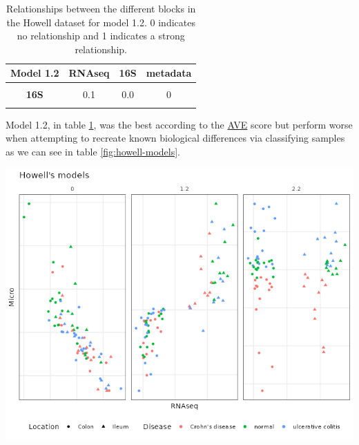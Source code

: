 \documentclass[
  12pt,
  a4paper,
  twoside,
  openright]{book}
\let\origfigure\figure
\let\endorigfigure\endfigure
\renewenvironment{figure}[1][2] {
    \expandafter\origfigure\expandafter[!htbp]
} {
    \endorigfigure
}
\begin{document}
\begin{table}[H]

\caption[Model 1.2 of the Howell dataset.]{\label{tab:howell-model1-2}Relationships between the different blocks in the Howell dataset for model 1.2. 0 indicates no relationship and 1 indicates a strong relationship.}
\centering
\begin{tabular}[t]{>{}c|c|c|c}
\hline
\textbf{Model 1.2} & \textbf{RNAseq} & \textbf{16S} & \textbf{metadata}\\
\hline
\textbf{\cellcolor{gray!6}{RNAseq}} & \cellcolor{gray!6}{0.0} & \cellcolor{gray!6}{0.1} & \cellcolor{gray!6}{1}\\
\hline
\textbf{16S} & 0.1 & 0.0 & 0\\
\hline
\textbf{\cellcolor{gray!6}{metadata}} & \cellcolor{gray!6}{1.0} & \cellcolor{gray!6}{0.0} & \cellcolor{gray!6}{0}\\
\hline
\end{tabular}
\end{table}

Model 1.2, in table \ref{tab:howell-model1-2}, was the best according to the \protect\hyperlink{acronyms_AVE}{AVE} score but perform worse when attempting to recreate known biological differences via classifying samples as we can see in table \ref{fig:howell-models}.

\begin{figure}
\includegraphics[width=1\linewidth]{images/howell-models} \caption[Models from the inteRmodel of the Howell dataset.]{Models from the inteRmodel of the Howell dataset. The three main models, model 0, 1.2 and 2.2 on the Howell dataset colored by section colon, ileum and shape according to the disease: square, ulcerative colitis; triangle, normal; circle, Crohn's disease. Model 0 has just trancriptomic and microbiome data, model 1.2 has transcriptomic, microbiome and sample data and model 2.2 has transcriptomic, microbiome and sample data split in different blocks.}\label{fig:howell-models}
\end{figure}
\end{document}
